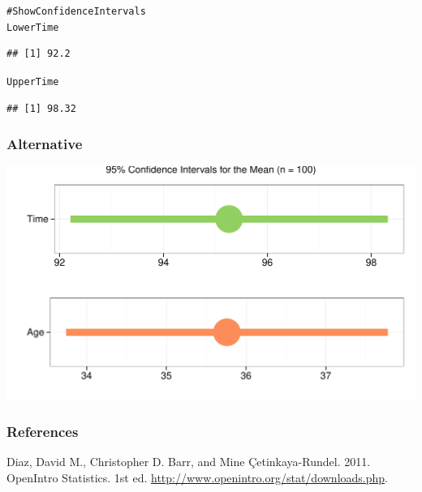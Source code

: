 \documentclass{beamer}\usepackage{graphicx, color}
\makeatletter
\def\maxwidth{ %
  \ifdim\Gin@nat@width>\linewidth
    \linewidth
  \else
    \Gin@nat@width
  \fi
}
\newcommand{\hlcomment}[1]{\textcolor[rgb]{0.180392156862745,0.6,0.341176470588235}{#1}}%
\newenvironment{kframe}{%
 \def\at@end@of@kframe{}%
 \ifinner\ifhmode%
  \def\at@end@of@kframe{\end{minipage}}%
  \begin{minipage}{\columnwidth}%
 \fi\fi%
 \def\FrameCommand##1{\hskip\@totalleftmargin \hskip-\fboxsep
 \colorbox{shadecolor}{##1}\hskip-\fboxsep
     \hskip-\linewidth \hskip-\@totalleftmargin \hskip\columnwidth}%
 \MakeFramed {\advance\hsize-\width
   \@totalleftmargin\z@ \linewidth\hsize
   \@setminipage}}%
 {\par\unskip\endMakeFramed%
 \at@end@of@kframe}
\newenvironment{knitrout}{}{} %
\makeatother
\begin{document}
\begin{frame}[fragile]
\begin{knitrout}
\color{fgcolor}\begin{kframe}
\begin{alltt}
\hlcomment{# Show Confidence Intervals}
LowerTime
\end{alltt}
\begin{verbatim}
## [1] 92.2
\end{verbatim}
\begin{alltt}

UpperTime
\end{alltt}
\begin{verbatim}
## [1] 98.32
\end{verbatim}
\end{kframe}
\end{knitrout}




\end{frame}


\begin{frame}[fragile]
  \frametitle{Alternative}



\begin{knitrout}
\color{fgcolor}

{\centering \includegraphics[width=\maxwidth]{figure/ConfIntPlot} 

}


\end{knitrout}

\end{frame}


\begin{frame}[allowframebreaks]
  \frametitle{References}
  Diaz, David M., Christopher D. Barr, and Mine \c{C}etinkaya-Rundel. 2011. OpenIntro Statistics. 1st ed. \url{http://www.openintro.org/stat/downloads.php}. \\[0.25cm] 
\end{frame}
\end{document}
